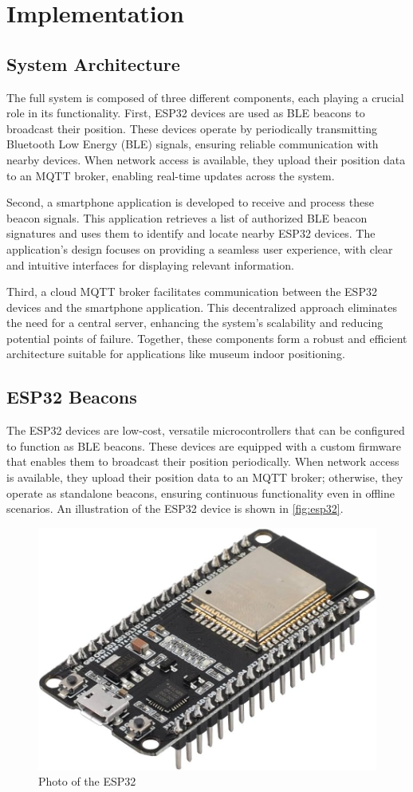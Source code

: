 \chapter{Implementation}
\label{chap:implementation}

\section{System Architecture}
The full system is composed of three different components, each playing a crucial role in its functionality. First, ESP32 devices are used as BLE beacons to broadcast their position. These devices operate by periodically transmitting Bluetooth Low Energy (BLE) signals, ensuring reliable communication with nearby devices. When network access is available, they upload their position data to an MQTT broker, enabling real-time updates across the system.

Second, a smartphone application is developed to receive and process these beacon signals. This application retrieves a list of authorized BLE beacon signatures and uses them to identify and locate nearby ESP32 devices. The application’s design focuses on providing a seamless user experience, with clear and intuitive interfaces for displaying relevant information.

Third, a cloud MQTT broker facilitates communication between the ESP32 devices and the smartphone application. This decentralized approach eliminates the need for a central server, enhancing the system’s scalability and reducing potential points of failure. Together, these components form a robust and efficient architecture suitable for applications like museum indoor positioning.

\section{ESP32 Beacons}
The ESP32 devices are low-cost, versatile microcontrollers that can be configured to function as BLE beacons. These devices are equipped with a custom firmware that enables them to broadcast their position periodically. When network access is available, they upload their position data to an MQTT broker; otherwise, they operate as standalone beacons, ensuring continuous functionality even in offline scenarios. An illustration of the ESP32 device is shown in \autoref{fig:esp32}.

\begin{figure}
    \centering
    \includegraphics[width=0.5\linewidth]{assets/image-esp32.jpg}
    \caption{Photo of the ESP32}
    \label{fig:esp32}
\end{figure}

